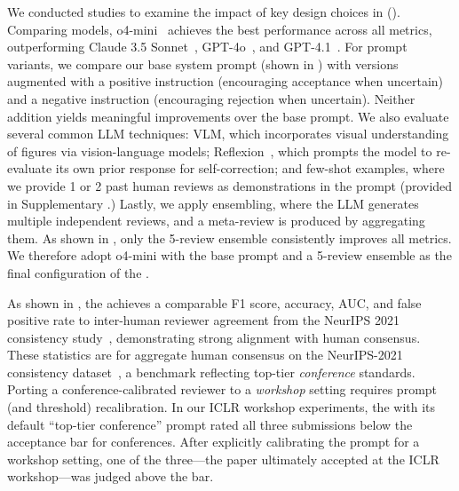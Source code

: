 \begin{appendices}
We conducted studies to examine the impact of key design choices in \ourreviewer ().
Comparing models, o4-mini~\citep{openai2025o3o4mini} achieves the best performance across all metrics, outperforming Claude 3.5 Sonnet~\citep{claude3}, GPT-4o~\citep{gpt4}, and GPT-4.1~\citep{openai_gpt41_2025}.
For prompt variants, we compare our base system prompt (shown in ) with versions augmented with a positive instruction (encouraging acceptance when uncertain) and a negative instruction (encouraging rejection when uncertain).
Neither addition yields meaningful improvements over the base prompt.
We also evaluate several common LLM techniques: VLM, which incorporates visual understanding of figures via vision-language models; Reflexion~\citep{shinn2023reflexion}, which prompts the model to re-evaluate its own prior response for self-correction; and few-shot examples, where we provide 1 or 2 past human reviews as demonstrations in the prompt (provided in Supplementary .)
Lastly, we apply ensembling, where the LLM generates multiple independent reviews, and a meta-review is produced by aggregating them.
As shown in , only the 5-review ensemble consistently improves all metrics.
We therefore adopt o4-mini with the base prompt and a 5-review ensemble as the final configuration of the \ourreviewer.

As shown in , the \ourreviewer achieves a comparable F1 score, accuracy, AUC, and false positive rate to inter-human reviewer agreement from the NeurIPS 2021 consistency study~\citep{beygelzimer2021neurips}, demonstrating strong alignment with human consensus.
These statistics are for aggregate human consensus on the NeurIPS-2021 consistency dataset~\citep{beygelzimer2021neurips}, a benchmark reflecting top-tier \textit{conference} standards. Porting a conference-calibrated reviewer to a \textit{workshop} setting requires prompt (and threshold) recalibration. In our ICLR workshop experiments, the \ourreviewer with its default ``top-tier conference'' prompt rated all three submissions below the acceptance bar for conferences. After explicitly calibrating the prompt for a workshop setting, one of the three—the paper ultimately accepted at the ICLR workshop—was judged above the bar.


\end{appendices}
